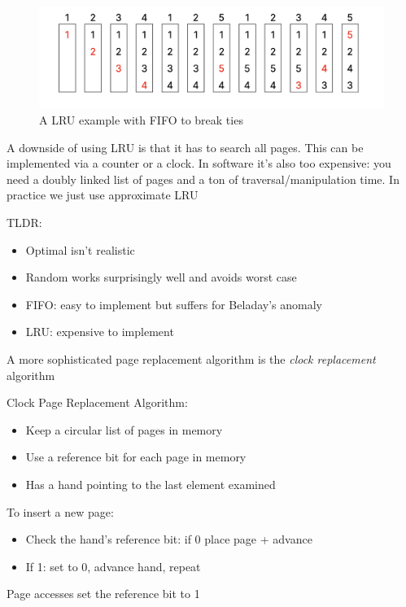 \documentclass[../notes.tex]{subfiles}
\begin{document}
\begin{figure}[H]
    \centering
    \includegraphics[width=0.8\linewidth]{img/image_2023-03-29-13-53-24.png}
    \caption{A LRU example with FIFO to break ties}
\end{figure}

A downside of using LRU is that it has to search all pages. This can be implemented via a counter or a clock. In software it's also too expensive: you need a doubly linked list of pages and a ton of traversal/manipulation time.
In practice we just use approximate LRU

TLDR:

\begin{itemize}
    \item Optimal isn't realistic
    \item Random works surprisingly well and avoids worst case
    \item FIFO: easy to implement but suffers for Beladay's anomaly
    \item LRU: expensive to implement
\end{itemize}


A more sophisticated page replacement algorithm is the \textit{clock replacement} algorithm

\begin{definition}
    Clock Page Replacement Algorithm:

    \begin{itemize}
        \item Keep a circular list of pages in memory
        \item Use a reference bit for each page in memory
        \item Has a hand pointing to the last element examined
    \end{itemize}

    To insert a new page:
        \begin{itemize}
            \item Check the hand's reference bit: if 0 place page + advance
            \item If 1: set to 0, advance hand, repeat
        \end{itemize}
        Page accesses set the reference bit to 1
\end{definition}
\end{document}
